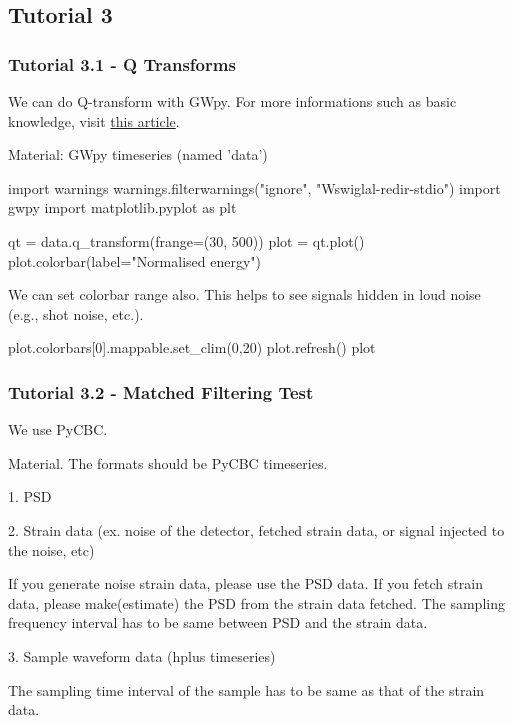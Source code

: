\subsection{Tutorial 3}

\subsubsection{Tutorial 3.1 - Q Transforms}

We can do Q-transform with GWpy. For more informations such as basic knowledge, visit \href{https://iopscience.iop.org/article/10.1088/0264-9381/21/20/024}{this article}.

Material: GWpy timeseries (named 'data')

\begin{python}[python3]
    import warnings
    warnings.filterwarnings("ignore", "Wswiglal-redir-stdio")
    import gwpy
    import matplotlib.pyplot as plt

    qt = data.q_transform(frange=(30, 500))
    plot = qt.plot()
    plot.colorbar(label="Normalised energy")
\end{python}

We can set colorbar range also. This helps to see signals hidden in loud noise (e.g., shot noise, etc.).

\begin{python}
    plot.colorbars[0].mappable.set_clim(0,20)
    plot.refresh()
    plot
\end{python}

\subsubsection{Tutorial 3.2 - Matched Filtering Test}

We use PyCBC.

Material. The formats should be PyCBC timeseries.

1. PSD

2. Strain data (ex. noise of the detector, fetched strain data, or signal injected to the noise, etc)

If you generate noise strain data, please use the PSD data. If you fetch strain data, please make(estimate) the PSD from the strain data fetched. The sampling frequency interval has to be same between PSD and the strain data.

3. Sample waveform data (hplus timeseries)

The sampling time interval of the sample has to be same as that of the strain data.

